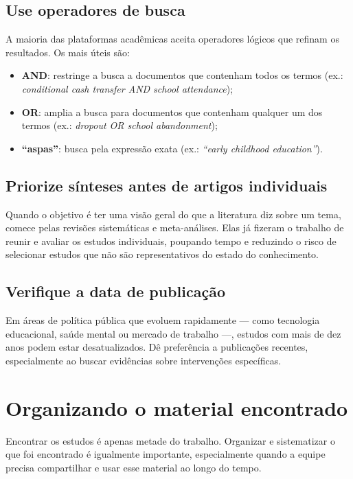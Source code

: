 \documentclass[12pt, a4paper, openany]{book}
\begin{document}
\subsection{Use operadores de busca}

A maioria das plataformas acadêmicas aceita operadores lógicos que refinam os
resultados. Os mais úteis são:

\begin{itemize}[leftmargin=*]
  \item \textbf{AND}: restringe a busca a documentos que contenham todos os
    termos (ex.: \textit{conditional cash transfer AND school attendance});
  \item \textbf{OR}: amplia a busca para documentos que contenham qualquer um
    dos termos (ex.: \textit{dropout OR school abandonment});
  \item \textbf{``aspas''}: busca pela expressão exata
    (ex.: \textit{``early childhood education''}).
\end{itemize}

\subsection{Priorize sínteses antes de artigos individuais}

Quando o objetivo é ter uma visão geral do que a literatura diz sobre um tema,
comece pelas revisões sistemáticas e meta-análises. Elas já fizeram o trabalho
de reunir e avaliar os estudos individuais, poupando tempo e reduzindo o risco
de selecionar estudos que não são representativos do estado do conhecimento.

\subsection{Verifique a data de publicação}

Em áreas de política pública que evoluem rapidamente --- como tecnologia
educacional, saúde mental ou mercado de trabalho ---, estudos com mais de dez
anos podem estar desatualizados. Dê preferência a publicações recentes,
especialmente ao buscar evidências sobre intervenções específicas.

\section{Organizando o material encontrado}

Encontrar os estudos é apenas metade do trabalho. Organizar e sistematizar o
que foi encontrado é igualmente importante, especialmente quando a equipe
precisa compartilhar e usar esse material ao longo do tempo.
\end{document}
